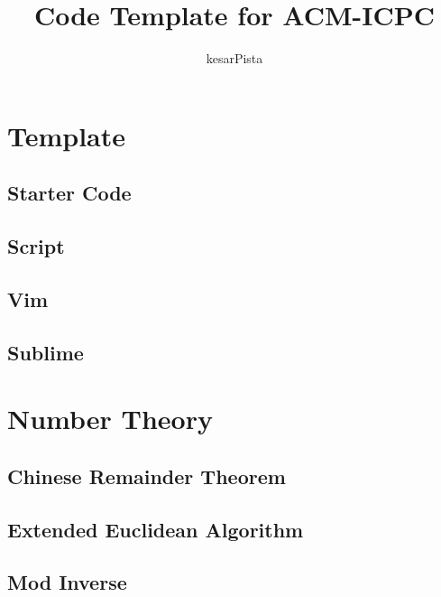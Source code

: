\documentclass[a4paper, twocolumn]{article}
\title{Code Template for ACM-ICPC}
\author{kesarPista}
\begin{document}
\begin{titlepage}
\maketitle
\thispagestyle{empty}
\pagebreak
\pagestyle{fancy}
\lhead{}
\rhead{}
\cfoot{}
\tableofcontents
\end{titlepage}

\pagestyle{fancy}
\cfoot{- \thepage \ -}
  
\section{Template}
\subsection{Starter Code}

\subsection{Script}

\subsection{Vim}

\subsection*{Sublime}


\section{Number Theory}
\subsection{Chinese Remainder Theorem}

\subsection{Extended Euclidean Algorithm}

\subsection{Mod Inverse}

\end{document}
